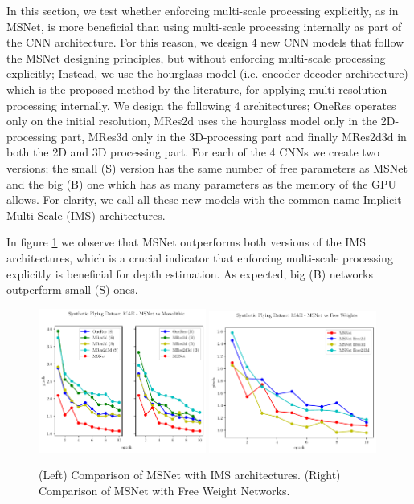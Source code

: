 \documentclass[runningheads]{llncs}
\begin{document}
In this section, we test whether enforcing multi-scale processing explicitly, as in MSNet, is more beneficial than using multi-scale processing internally as part of the CNN architecture. For this reason, we design 4 new CNN models that follow the MSNet designing principles, but without enforcing multi-scale processing explicitly; Instead, we use the hourglass model (i.e. encoder-decoder architecture) which is the proposed method by the literature, for applying multi-resolution processing internally. We design the following 4 architectures; OneRes operates only on the initial resolution, MRes2d uses the hourglass model only in the 2D-processing part, MRes3d only in the 3D-processing part and finally MRes2d3d in both the 2D and 3D processing part. For each of the 4 CNNs we create two versions; the small (S) version has the same number of free parameters as MSNet and the big (B) one which has as many parameters as the memory of the GPU allows. For clarity, we call all these new models with the common name Implicit Multi-Scale (IMS) architectures.

In figure \ref{fig:mae_SFNvsGenericNets} we observe that MSNet outperforms both versions of the IMS architectures, which is a crucial indicator that enforcing multi-scale processing explicitly is beneficial for depth estimation. As expected, big (B) networks outperform small (S) ones.

\begin{figure}[!htbp]
    \centering
    \includegraphics[width=0.49\textwidth]{figures/freiburg_msnet_vs_monolithic_mae.pdf}
    \includegraphics[width=0.49\textwidth]{figures/freiburg_msnet_vs_free_weights_mae.pdf}
    \caption{(Left) Comparison of MSNet with IMS architectures. (Right) Comparison of MSNet with Free Weight Networks.}
    \label{fig:mae_SFNvsGenericNets}
\end{figure}
\end{document}
